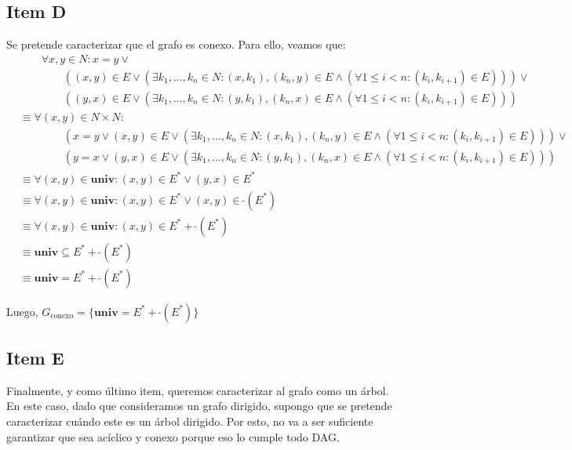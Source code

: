 \documentclass{article}
\newcommand{\univ}{\textbf{univ}}
\newcommand{\conv}[1]{\ \tilde{}#1}
\begin{document}
\subsection*{Item D}
Se pretende caracterizar que el grafo es conexo.
Para ello, veamos que:
\begin{equation*}
  \begin{aligned}
    &\qquad \forall x, y \in N : x = y \lor \\ 
    & \qquad\qquad ((x, y) \in E \lor (\exists k_1, \dots, k_n \in N : (x, k_1), (k_n, y) \in E \land (\forall 1 \leq i < n : (k_i, k_{i+1}) \in E))) \lor \\ 
    & \qquad\qquad ((y, x) \in E \lor (\exists k_1, \dots, k_n \in N : (y, k_1), (k_n, x) \in E \land (\forall 1 \leq i < n : (k_i, k_{i+1}) \in E))) \\ 
    &\equiv \forall (x, y) \in N \times N : \\ 
    &\qquad\qquad (x = y \lor (x, y) \in E \lor (\exists k_1, \dots, k_n \in N : (x, k_1), (k_n, y) \in E \land (\forall 1 \leq i < n : (k_i, k_{i+1}) \in E))) \lor \\ 
    &\qquad\qquad (y = x \lor (y, x) \in E \lor (\exists k_1, \dots, k_n \in N : (y, k_1), (k_n, x) \in E \land (\forall 1 \leq i < n : (k_i, k_{i+1}) \in E))) \\
    &\equiv \forall (x, y) \in \univ : (x, y) \in E^* \lor (y, x) \in E^* \\ 
    &\equiv \forall (x, y) \in \univ : (x, y) \in E^* \lor (x, y) \in \conv{(E^*)} \\ 
    &\equiv \forall (x, y) \in \univ : (x, y) \in E^* + \conv{(E^*)} \\ 
    &\equiv \univ \subseteq E^* + \conv{(E^*)} \\ 
    &\equiv \univ = E^* + \conv{(E^*)}
  \end{aligned}
\end{equation*}

Luego, $G_\text{conexo} = \{\univ = E^* + \conv{(E^*)}\}$

\subsection*{Item E}
Finalmente, y como último item, queremos caracterizar al grafo como un árbol.
En este caso, dado que consideramos un grafo dirigido, supongo que se pretende caracterizar cuándo este es un árbol dirigido.
Por esto, no va a ser suficiente garantizar que sea acíclico y conexo porque eso lo cumple todo DAG.
\end{document}
